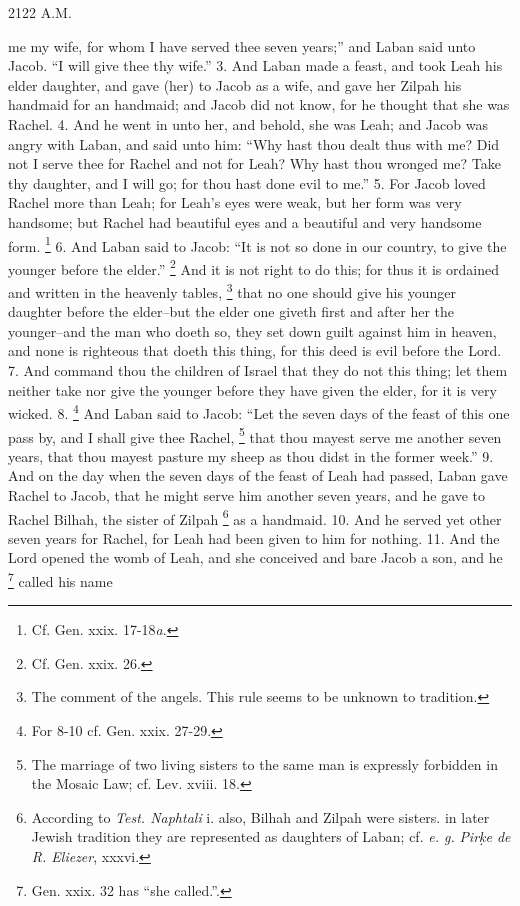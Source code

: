 2122 A.M.

me my wife, for whom I have served thee seven years;'' and Laban said unto Jacob. ``I will give thee thy wife.'' 3. And Laban made a feast, and took Leah his elder daughter, and gave (her) to Jacob as a wife, and gave her Zilpah his handmaid for an handmaid; and Jacob did not know, for he thought that she was Rachel. 4. And he went in unto her, and behold, she was Leah; and Jacob was angry with Laban, and said unto him: ``Why hast thou dealt thus with me? Did not I serve thee for Rachel and not for Leah? Why hast thou wronged me? Take thy daughter, and I will go; for thou hast done evil to me.'' 5. For Jacob loved Rachel more than Leah; for Leah's eyes were weak, but her form was very handsome; but Rachel had beautiful eyes and a beautiful and very handsome form. \footnote{Cf. Gen. xxix. 17-18\emph{a}.} 6. And Laban said to Jacob: ``It is not so done in our country, to give the younger before the elder.'' \footnote{Cf. Gen. xxix. 26.} And it is not right to do this; for thus it is ordained and written in the heavenly tables, \footnote{The comment of the angels. This rule seems to be unknown to tradition.} that no one should give his younger daughter before the elder--but the elder one giveth first and after her the younger--and the man who doeth so, they set down guilt against him in heaven, and none is righteous that doeth this thing, for this deed is evil before the Lord. 7. And command thou the children of Israel that they do not this thing; let them neither take nor give the younger before they have given the elder, for it is very wicked. 8. \footnote{For 8-10 cf. Gen. xxix. 27-29.} And Laban said to Jacob: ``Let the seven days of the feast of this one pass by, and I shall give thee Rachel, \footnote{The marriage of two living sisters to the same man is expressly forbidden in the Mosaic Law; cf. Lev. xviii. 18.} that thou mayest serve me another seven years, that thou mayest pasture my sheep as thou didst in the former week.'' 9. And on the day when the seven days of the feast of Leah had passed, Laban gave Rachel to Jacob, that he might serve him another seven years, and he gave to Rachel Bilhah, the sister of Zilpah \footnote{According to \emph{Test. Naphtali} i. also, Bilhah and Zilpah were sisters. in later Jewish tradition they are represented as daughters of Laban; cf. \emph{e. g.} \emph{Pir\d{k}e de R. Eliezer}, xxxvi.} as a handmaid. 10. And he served yet other seven years for Rachel, for Leah had been given to him for nothing. 11. And the Lord opened the womb of Leah, and she conceived and bare Jacob a son, and he \footnote{Gen. xxix. 32 has ``she called.''.} called his name

